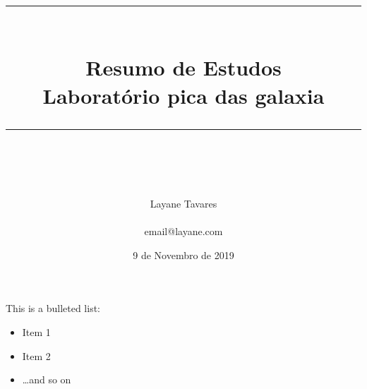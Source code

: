 \documentclass[idxtotoc,hyperref,openany]{labbook} %
\newcommand{\HRule}{\rule{\linewidth}{0.5mm}} %
\begin{document}

\frontmatter %
\title{
\begin{center}
\HRule \\[0.4cm]
{\Huge \bfseries Resumo de Estudos \\[0.5cm] \Large Laboratório pica das galaxia}\\[0.4cm] %
\HRule \\[1.5cm]
\end{center}
}
\author{\Huge Layane Tavares \\ \\ \LARGE email@layane.com \\[2cm]} %
\date{9 de Novembro de 2019} %
\maketitle

\tableofcontents

\mainmatter %


\lipsum[1]



\lipsum[3-5]

This is a bulleted list:

\begin{itemize}
\item Item 1
\item Item 2
\item \ldots and so on
\end{itemize}


\lipsum[6]


\lipsum[7]
\end{document}
